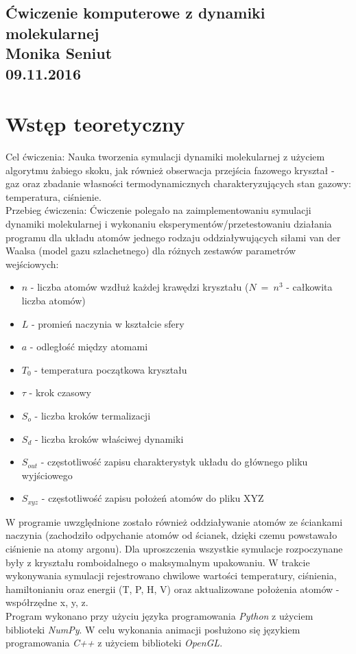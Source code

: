 \documentclass[10]{article}
\begin{document}
\begin{center}
\section*{Ćwiczenie komputerowe z dynamiki molekularnej\\
Monika Seniut\\ 09.11.2016}
\end{center}
\vspace{3cm}
\section{ Wstęp teoretyczny }
Cel ćwiczenia: Nauka tworzenia symulacji dynamiki molekularnej z użyciem algorytmu żabiego skoku, jak również obserwacja przejścia fazowego kryształ - gaz oraz zbadanie własności termodynamicznych charakteryzujących stan gazowy: temperatura, ciśnienie.\\
Przebieg ćwiczenia: Ćwiczenie polegało na zaimplementowaniu symulacji dynamiki molekularnej i wykonaniu eksperymentów/przetestowaniu działania programu dla układu atomów jednego rodzaju oddziaływujących siłami van der Waalsa (model gazu szlachetnego) dla różnych zestawów parametrów wejściowych: 
\begin{itemize}
\item $n$ - liczba atomów wzdłuż każdej krawędzi kryształu ($N ~=~n^3$ - całkowita liczba atomów)
\item $L$ - promień naczynia w kształcie sfery
\item $a$ - odległość między atomami
\item $T_0$ - temperatura początkowa kryształu
\item $\tau$ - krok czasowy
\item $S_o$ - liczba kroków termalizacji
\item $S_d$ - liczba kroków właściwej dynamiki
\item $S_{out}$ - częstotliwość zapisu charakterystyk układu do głównego pliku wyjściowego
\item $S_{xyz}$ - częstotliwość zapisu położeń atomów do pliku XYZ
\end{itemize}
W programie uwzględnione zostało również oddziaływanie atomów ze ściankami naczynia (zachodziło odpychanie atomów od ścianek, dzięki czemu powstawało ciśnienie na atomy argonu).
Dla uproszczenia wszystkie symulacje rozpoczynane były z kryształu romboidalnego o maksymalnym upakowaniu.
W trakcie wykonywania symulacji rejestrowano chwilowe wartości temperatury, ciśnienia, hamiltonianiu oraz energii (T, P, H, V) oraz aktualizowane położenia atomów - współrzędne x, y, z.\\
Program wykonano przy użyciu języka programowania \textit{Python} z użyciem biblioteki \textit{NumPy}. W celu wykonania animacji posłużono się językiem programowania \textit{C++} z użyciem biblioteki \textit{OpenGL}.
\end{document}
